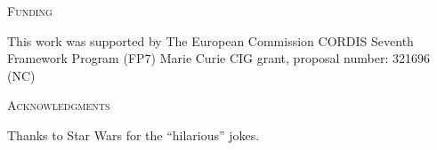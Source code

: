\documentclass[a4paper,12pt]{article}
\renewcommand{\section}[1]{%
\bigskip
\begin{center}
\begin{Large}
\normalfont\scshape #1
\medskip
\end{Large}
\end{center}}
\begin{document}











\section{Funding}
This work was supported by The European Commission CORDIS Seventh Framework Program (FP7) Marie Curie CIG grant, proposal number: 321696 (NC)

\section{Acknowledgments}
Thanks to Star Wars for the ``hilarious'' jokes.



\end{document}
